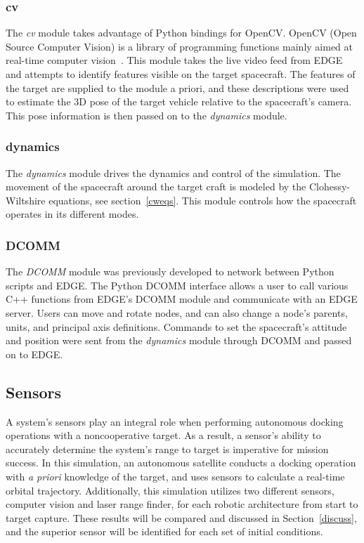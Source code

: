 \documentclass[journal, 10pt]{IEEEtran}
\begin{document}
\subsubsection{cv}
The \textit{cv} module takes advantage of Python bindings for OpenCV. OpenCV (Open Source Computer Vision) is a library of programming functions mainly aimed at real-time computer vision~\cite{opencv}. This module takes the live video feed from EDGE and attempts to identify features visible on the target spacecraft. The features of the target are supplied to the module a priori, and these descriptions were used to estimate the 3D pose of the target vehicle relative to the spacecraft's camera. This pose information is then passed on to the \textit{dynamics} module.

\subsubsection{dynamics}
The \textit{dynamics} module drives the dynamics and control of the simulation. The movement of the spacecraft around the target craft is modeled by the Clohessy-Wiltshire equations, see section~\ref{cweqs}. This module controls how the spacecraft operates in its different modes. 

\subsubsection{DCOMM}
The \textit{DCOMM} module was previously developed to network between Python scripts and EDGE. The Python DCOMM interface allows a user to call various C++ functions from EDGE's DCOMM module and communicate with an EDGE server. Users can move and rotate nodes, and can also change a node's parents, units, and principal axis definitions. Commands to set the spacecraft's attitude and position were sent from the \textit{dynamics} module through DCOMM and passed on to EDGE. 

\subsection{Sensors}
A system's sensors play an integral role when performing autonomous docking operations with a noncooperative target. As a result, a sensor's ability to accurately determine the system's range to target is imperative for mission success. In this simulation, an autonomous satellite conducts a docking operation with \textit{a priori} knowledge of the target, and uses sensors to calculate a real-time orbital trajectory. Additionally, this simulation utilizes two different sensors, computer vision and laser range finder, for each robotic architecture from start to target capture. These results will be compared and discussed in Section~\ref{discuss}, and the superior sensor will be identified for each set of initial conditions. 
\end{document}
